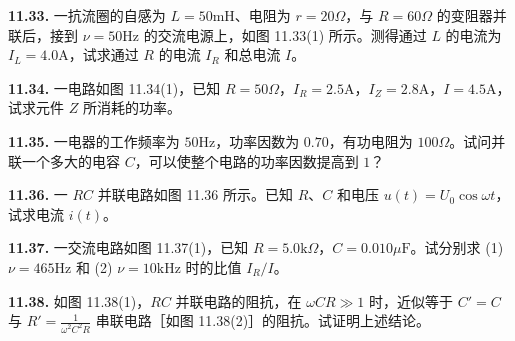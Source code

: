 \begin{center}
\end{center}

\vfill
\newpage

\textbf{11.33.} 一抗流圈的自感为 $L = 50\mathrm{mH}$、电阻为 $r = 20\Omega$，与 $R = 60\Omega$ 的变阻器并联后，接到 $\nu = 50\mathrm{Hz}$ 的交流电源上，如图 11.33(1) 所示。测得通过 $L$ 的电流为 $I_{L} = 4.0\mathrm{A}$，试求通过 $R$ 的电流 $I_{R}$ 和总电流 $I$。

\begin{center}
\end{center}

\vfill
\newpage

\textbf{11.34.} 一电路如图 11.34(1)，已知 $R = 50\Omega$，$I_{R} = 2.5\mathrm{A}$，$I_{Z} = 2.8\mathrm{A}$，$I = 4.5\mathrm{A}$，试求元件 $Z$ 所消耗的功率。

\begin{center}
\end{center}

\vfill
\newpage

\textbf{11.35.} 一电器的工作频率为 $50\mathrm{Hz}$，功率因数为 $0.70$，有功电阻为 $100\Omega$。试问并联一个多大的电容 $C$，可以使整个电路的功率因数提高到 $1$？

\vfill
\newpage

\textbf{11.36.} 一 $RC$ 并联电路如图 11.36 所示。已知 $R$、$C$ 和电压 $u(t) = U_{0}\cos\omega t$，试求电流 $i(t)$。

\begin{center}
\end{center}

\vfill
\newpage

\textbf{11.37.} 一交流电路如图 11.37(1)，已知 $R = 5.0\mathrm{k}\Omega$，$C = 0.010\mu\mathrm{F}$。试分别求 (1) $\nu = 465\mathrm{Hz}$ 和 (2) $\nu = 10\mathrm{kHz}$ 时的比值 $I_{R}/I$。

\begin{center}
\end{center}

\vfill
\newpage

\textbf{11.38.} 如图 11.38(1)，$RC$ 并联电路的阻抗，在 $\omega CR \gg 1$ 时，近似等于 $C' = C$ 与 $\displaystyle R' = \frac{1}{\omega^{2} C^{2} R}$ 串联电路［如图 11.38(2)］的阻抗。试证明上述结论。

